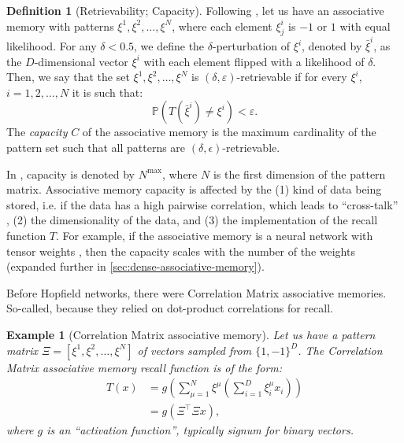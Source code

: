 \documentclass{article}
\newtheorem{example}{Example}[subsection]
\theoremstyle{definition}
\newtheorem{definition}{Definition}[subsection]
\begin{document}
\begin{definition}[Retrievability; Capacity]
  Following \textcite{bao_capacity_2022}, let us have an associative
  memory with patterns
  $\xi^1, \xi^2, \dots, \xi^N$, where each element $\xi^i_j$ is
  $-1$ or $1$ with equal likelihood. For any $\delta < 0.5$, we define
  the $\delta$-perturbation of $\xi^i$, denoted by $\bar \xi^i$, as
  the $D$-dimensional vector $\xi^i$ with each element flipped with a likelihood
  of $\delta$. Then, we say that the set $\xi^1, \xi^2, \dots, \xi^N$ is
  $(\delta, \varepsilon)$-retrievable if for every $\xi^i$, $i = 1, 2, \dots, N$
  it is such that:
  \begin{equation}
    \mathbb{P}(T(\bar \xi^i) \neq \xi^i) < \varepsilon.
  \end{equation}
  The \textit{capacity} $C$ of the associative memory is the maximum
  cardinality of the pattern set such that all patterns are $(\delta,
  \epsilon)$-retrievable.
\end{definition}

In \textcite{krotov_dense_2016}, capacity is denoted by $N^{\max}$, where
$N$ is the first dimension of the pattern matrix. Associative memory
capacity is affected by the (1) kind of data being stored,
i.e. if the data
has a high pairwise correlation, which leads to ``cross-talk''
\parencite{kohonen_correlation_1988},
(2) the dimensionality of the data, and (3) the implementation of the
recall function $T$.
For example, if the associative memory is a neural network with
tensor weights \parencite{kelly_memory_2017},
then the capacity scales with the number of the weights
\parencite{little_analytic_1978} (expanded
further in \autoref{sec:dense-associative-memory}).

Before Hopfield networks, there were Correlation Matrix associative memories.
So-called, because they relied on dot-product correlations for recall.
\begin{example}[Correlation Matrix associative
  memory]\label{example:correlation}
  Let us have a pattern matrix $\Xi = [\xi^1, \xi^2, \dots, \xi^N]$ of
  vectors sampled from $\{1, -1\}^D$. The Correlation Matrix associative memory
  recall function is of the form:
  \begin{align}
    T(x) &= g \left(\sum^N_{\mu=1} \xi^\mu \left( \sum^D_{i=1}
    \xi^\mu_i x_i \right)\right) \nonumber \\
    &= g \left( \Xi^\top \Xi x  \right),
  \end{align}
  where $g$ is an ``activation function'', typically \textit{signum} %
  for binary vectors.
\end{example}
\end{document}

